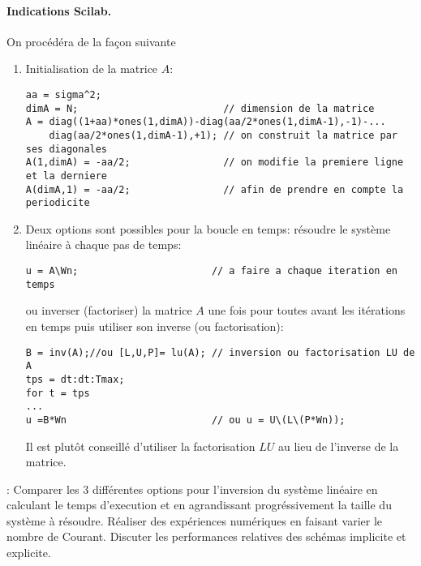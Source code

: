 \documentclass[12pt,a4paper]{article}
\begin{document}
\paragraph{Indications Scilab.} On proc\'ed\'era de la fa\c{c}on suivante
\begin{enumerate}
\item Initialisation de la matrice $A$:
\begin{verbatim}
aa = sigma^2;
dimA = N;                         // dimension de la matrice
A = diag((1+aa)*ones(1,dimA))-diag(aa/2*ones(1,dimA-1),-1)-...
    diag(aa/2*ones(1,dimA-1),+1); // on construit la matrice par ses diagonales
A(1,dimA) = -aa/2;                // on modifie la premiere ligne et la derniere
A(dimA,1) = -aa/2;                // afin de prendre en compte la periodicite       
\end{verbatim}
\item Deux options sont possibles pour la boucle en temps: r\'esoudre
le syst\`eme lin\'eaire \`a chaque pas de temps:
\begin{verbatim}
u = A\Wn;                       // a faire a chaque iteration en temps
\end{verbatim}
 ou inverser (factoriser) la matrice $A$ une fois pour toutes avant les it\'erations en temps puis utiliser son
inverse (ou factorisation):
\begin{verbatim}
B = inv(A);//ou [L,U,P]= lu(A); // inversion ou factorisation LU de A 
tps = dt:dt:Tmax;
for t = tps  
...
u =B*Wn                         // ou u = U\(L\(P*Wn));
\end{verbatim}
Il est plut\^ot conseill\'e d'utiliser la factorisation $LU$ au lieu
de l'inverse de la matrice.
\end{enumerate}

: Comparer les 3 diff\'erentes options pour l'inversion
du syst\`eme lin\'eaire en calculant le temps d'execution et en
agrandissant progr\'essivement la taille du syst\`eme \`a r\'esoudre. R\'ealiser des exp\'eriences num\'eriques en
faisant varier le nombre de Courant. Discuter les performances
relatives des sch\'emas implicite et explicite.
\end{document}
